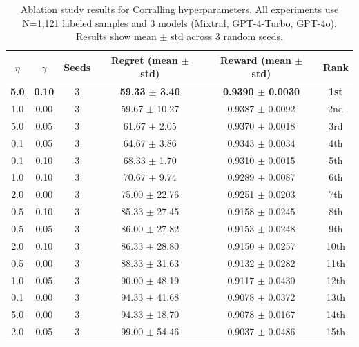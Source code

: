 \begin{table}[h]
\centering
\caption{Ablation study results for Corralling hyperparameters. All experiments use N=1,121 labeled samples and 3 models (Mixtral, GPT-4-Turbo, GPT-4o). Results show mean $\pm$ std across 3 random seeds.}
\label{tab:corralling_ablation}
\small
\begin{tabular}{cccccc}
\toprule
$\eta$ & $\gamma$ & Seeds & Regret (mean $\pm$ std) & Reward (mean $\pm$ std) & Rank \\
\midrule
\textbf{5.0} & \textbf{0.10} & 3 & \textbf{59.33 $\pm$ 3.40} & \textbf{0.9390 $\pm$ 0.0030} & \textbf{1st} \\
1.0 & 0.00 & 3 & 59.67 $\pm$ 10.27 & 0.9387 $\pm$ 0.0092 & 2nd \\
5.0 & 0.05 & 3 & 61.67 $\pm$ 2.05 & 0.9370 $\pm$ 0.0018 & 3rd \\
0.1 & 0.05 & 3 & 64.67 $\pm$ 3.86 & 0.9343 $\pm$ 0.0034 & 4th \\
0.1 & 0.10 & 3 & 68.33 $\pm$ 1.70 & 0.9310 $\pm$ 0.0015 & 5th \\
1.0 & 0.10 & 3 & 70.67 $\pm$ 9.74 & 0.9289 $\pm$ 0.0087 & 6th \\
2.0 & 0.00 & 3 & 75.00 $\pm$ 22.76 & 0.9251 $\pm$ 0.0203 & 7th \\
0.5 & 0.10 & 3 & 85.33 $\pm$ 27.45 & 0.9158 $\pm$ 0.0245 & 8th \\
0.5 & 0.05 & 3 & 86.00 $\pm$ 27.82 & 0.9153 $\pm$ 0.0248 & 9th \\
2.0 & 0.10 & 3 & 86.33 $\pm$ 28.80 & 0.9150 $\pm$ 0.0257 & 10th \\
0.5 & 0.00 & 3 & 88.33 $\pm$ 31.63 & 0.9132 $\pm$ 0.0282 & 11th \\
1.0 & 0.05 & 3 & 90.00 $\pm$ 48.19 & 0.9117 $\pm$ 0.0430 & 12th \\
0.1 & 0.00 & 3 & 94.33 $\pm$ 41.68 & 0.9078 $\pm$ 0.0372 & 13th \\
5.0 & 0.00 & 3 & 94.33 $\pm$ 18.70 & 0.9078 $\pm$ 0.0167 & 14th \\
2.0 & 0.05 & 3 & 99.00 $\pm$ 54.46 & 0.9037 $\pm$ 0.0486 & 15th \\
\bottomrule
\end{tabular}
\end{table}

